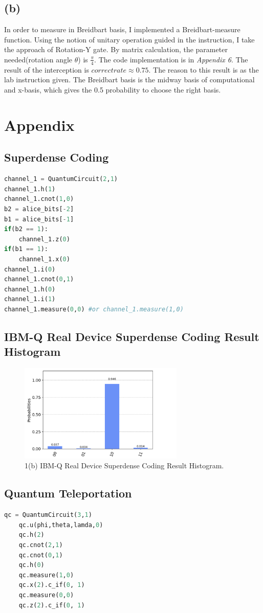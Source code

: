 \documentclass{article}
\begin{document}
\begin{CJK*}{UTF8}{bsmi}
\subsection{(b)}
In order to  measure in Breidbart basis, I implemented a Breidbart-measure function. Using the notion of unitary operation guided in the instruction, I take the approach of Rotation-Y gate. By matrix calculation, the parameter needed(rotation angle $\theta$) is $\frac{\pi}{4}$. The code implementation is in \emph {Appendix 6}. 
The result of the interception is $correct rate \approx 0.75 $.
The reason to this result is as the lab instruction given. The Breidbart basis is the midway basis of computational and x-basis, which gives the 0.5 probability to choose the right basis.
\section{Appendix}
\subsection{Superdense Coding}
\begin{lstlisting}[language=Python]
channel_1 = QuantumCircuit(2,1)
channel_1.h(1)
channel_1.cnot(1,0)
b2 = alice_bits[-2]
b1 = alice_bits[-1]
if(b2 == 1):
    channel_1.z(0)
if(b1 == 1):
    channel_1.x(0)
channel_1.i(0)
channel_1.cnot(0,1)
channel_1.h(0)
channel_1.i(1)
channel_1.measure(0,0) #or channel_1.measure(1,0)
\end{lstlisting}
\subsection{IBM-Q Real Device Superdense Coding Result Histogram}
\begin{figure}[h]
\centering
\includegraphics[width=0.7\textwidth]{1b.png}
\caption{\label{fig:1b}1(b) IBM-Q Real Device Superdense Coding Result Histogram.}
\end{figure}
\subsection{Quantum Teleportation}
 \begin{lstlisting}[language = Python]
    qc = QuantumCircuit(3,1)
    qc.u(phi,theta,lamda,0)
    qc.h(2)
    qc.cnot(2,1)
    qc.cnot(0,1)
    qc.h(0)
    qc.measure(1,0)
    qc.x(2).c_if(0, 1)
    qc.measure(0,0)
    qc.z(2).c_if(0, 1)
\end{lstlisting}

\end{CJK*}
\end{document}
